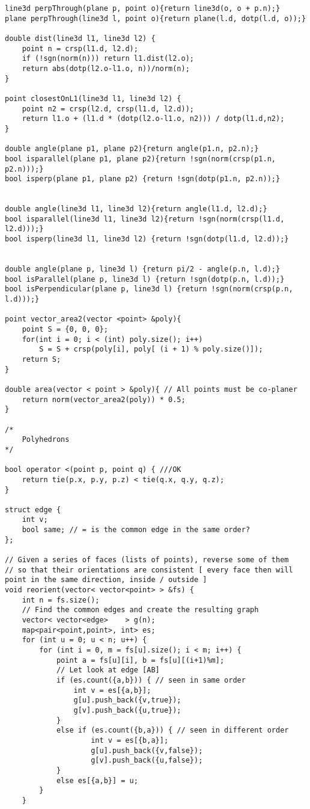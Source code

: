 \documentclass[10pt,a4paper,onesided]{article}
\begin{document}
\begin{multicols*}{3}
\begin{lstlisting}
line3d perpThrough(plane p, point o){return line3d(o, o + p.n);}
plane perpThrough(line3d l, point o){return plane(l.d, dotp(l.d, o));}

double dist(line3d l1, line3d l2) {
    point n = crsp(l1.d, l2.d);
    if (!sgn(norm(n))) return l1.dist(l2.o);
    return abs(dotp(l2.o-l1.o, n))/norm(n);
}

point closestOnL1(line3d l1, line3d l2) {
    point n2 = crsp(l2.d, crsp(l1.d, l2.d));
    return l1.o + (l1.d * (dotp(l2.o-l1.o, n2))) / dotp(l1.d,n2);
}

double angle(plane p1, plane p2){return angle(p1.n, p2.n);}
bool isparallel(plane p1, plane p2){return !sgn(norm(crsp(p1.n, p2.n)));}
bool isperp(plane p1, plane p2) {return !sgn(dotp(p1.n, p2.n));}


double angle(line3d l1, line3d l2){return angle(l1.d, l2.d);}
bool isparallel(line3d l1, line3d l2){return !sgn(norm(crsp(l1.d, l2.d)));}
bool isperp(line3d l1, line3d l2) {return !sgn(dotp(l1.d, l2.d));}


double angle(plane p, line3d l) {return pi/2 - angle(p.n, l.d);}
bool isParallel(plane p, line3d l) {return !sgn(dotp(p.n, l.d));}
bool isPerpendicular(plane p, line3d l) {return !sgn(norm(crsp(p.n, l.d)));}

point vector_area2(vector <point> &poly){
    point S = {0, 0, 0};
    for(int i = 0; i < (int) poly.size(); i++)
        S = S + crsp(poly[i], poly[ (i + 1) % poly.size()]);
    return S;
}

double area(vector < point > &poly){ // All points must be co-planer
    return norm(vector_area2(poly)) * 0.5;
}

/*
    Polyhedrons
*/

bool operator <(point p, point q) { ///OK
    return tie(p.x, p.y, p.z) < tie(q.x, q.y, q.z);
}

struct edge {
    int v;
    bool same; // = is the common edge in the same order?
};

// Given a series of faces (lists of points), reverse some of them
// so that their orientations are consistent [ every face then will point in the same direction, inside / outside ]
void reorient(vector< vector<point> > &fs) {
    int n = fs.size();
    // Find the common edges and create the resulting graph
    vector< vector<edge>    > g(n);
    map<pair<point,point>, int> es;
    for (int u = 0; u < n; u++) {
        for (int i = 0, m = fs[u].size(); i < m; i++) {
            point a = fs[u][i], b = fs[u][(i+1)%m];
            // Let look at edge [AB]
            if (es.count({a,b})) { // seen in same order
                int v = es[{a,b}];
                g[u].push_back({v,true});
                g[v].push_back({u,true});
            }
            else if (es.count({b,a})) { // seen in different order
                    int v = es[{b,a}];
                    g[u].push_back({v,false});
                    g[v].push_back({u,false});
            }
            else es[{a,b}] = u;
        }
    }


\end{lstlisting}
\end{multicols*}
\end{document}
